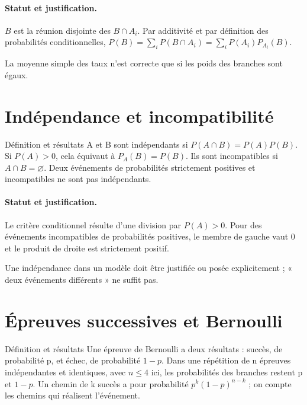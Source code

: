 \paragraph{Statut et justification.} $B$ est la réunion disjointe des $B\cap A_i$. Par additivité et par définition des probabilités conditionnelles, $P(B)=\sum_iP(B\cap A_i)=\sum_iP(A_i)P_{A_i}(B)$.
\label{C05-EX2}

\begin{erreur}La moyenne simple des taux n’est correcte que si les poids des branches sont égaux.\end{erreur}
\label{C05-AP2}
\section{Indépendance et incompatibilité}\label{C05-U3}
\begin{repere}{Définition et résultats}
A et B sont indépendants si $P(A\cap B)=P(A)P(B)$. Si $P(A)>0$, cela équivaut à $P_A(B)=P(B)$. Ils sont incompatibles si $A\cap B=\varnothing$. Deux événements de probabilités strictement positives et incompatibles ne sont pas indépendants.
\end{repere}
\paragraph{Statut et justification.} Le critère conditionnel résulte d’une division par $P(A)>0$. Pour des événements incompatibles de probabilités positives, le membre de gauche vaut 0 et le produit de droite est strictement positif.
\label{C05-EX3}
\begin{erreur}Une indépendance dans un modèle doit être justifiée ou posée explicitement ; « deux événements différents » ne suffit pas.\end{erreur}
\label{C05-AP3}
\section{Épreuves successives et Bernoulli}\label{C05-U4}
\begin{repere}{Définition et résultats}
Une épreuve de Bernoulli a deux résultats : succès, de probabilité p, et échec, de probabilité $1-p$. Dans une répétition de n épreuves indépendantes et identiques, avec $n\leq4$ ici, les probabilités des branches restent p et $1-p$. Un chemin de k succès a pour probabilité $p^k(1-p)^{n-k}$ ; on compte les chemins qui réalisent l’événement.
\end{repere}
